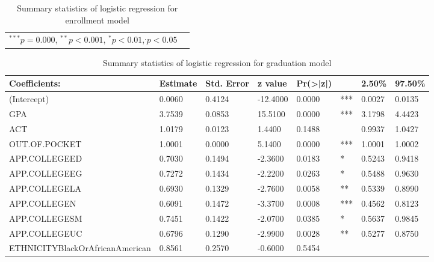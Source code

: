 \documentclass[12pt,english]{report}
\begin{document}
\begin{table}[]
\begin{adjustbox}{width=1.05\textwidth}
\begin{tabular}{lcccllcc}
\\
\hline
\multicolumn{7}{l}{\scriptsize{$^{***} p=0.000$, $^{**} p<0.001$, $^*
p<0.01$,$^{.}p<0.05$}}
\end{tabular}
\end{adjustbox}
\caption{Summary statistics of logistic regression for enrollment model}
\label{lr_summary}
\end{table}


        

\begin{table}[]
\centering
\caption{Summary statistics of logistic regression for graduation model}
\label{lr_summary2}
\begin{adjustbox}{width=1.05\textwidth}
\begin{tabular}{llllllll}
\hline
\hline
Coefficients:                   & Estimate & Std. Error & z value  &
Pr(\textgreater|z|) &     & 2.50\% & 97.50\%            \\ \hline
(Intercept)                     & 0.0060   & 0.4124     & -12.4000 & 0.0000    
& *** & 0.0027 & 0.0135             \\
GPA                             & 3.7539   & 0.0853     & 15.5100  & 0.0000    
& *** & 3.1798 & 4.4423             \\
ACT                             & 1.0179   & 0.0123     & 1.4400   & 0.1488    
&     & 0.9937 & 1.0427             \\
OUT.OF.POCKET                   & 1.0001   & 0.0000     & 5.1400   & 0.0000    
& *** & 1.0001 & 1.0002             \\
APP.COLLEGEED                   & 0.7030   & 0.1494     & -2.3600  & 0.0183    
& *   & 0.5243 & 0.9418             \\
APP.COLLEGEEG                   & 0.7272   & 0.1434     & -2.2200  & 0.0263    
& *   & 0.5488 & 0.9630             \\
APP.COLLEGELA                   & 0.6930   & 0.1329     & -2.7600  & 0.0058    
& **  & 0.5339 & 0.8990             \\
APP.COLLEGEN                    & 0.6091   & 0.1472     & -3.3700  & 0.0008    
& *** & 0.4562 & 0.8123             \\
APP.COLLEGESM                   & 0.7451   & 0.1422     & -2.0700  & 0.0385    
& *   & 0.5637 & 0.9845             \\
APP.COLLEGEUC                   & 0.6796   & 0.1290     & -2.9900  & 0.0028    
& **  & 0.5277 & 0.8750             \\
ETHNICITYBlackOrAfricanAmerican  & 0.8561   & 0.2570     & -0.6000  & 0.5454   


\end{tabular}
\end{adjustbox}
\end{table}
\end{document}
